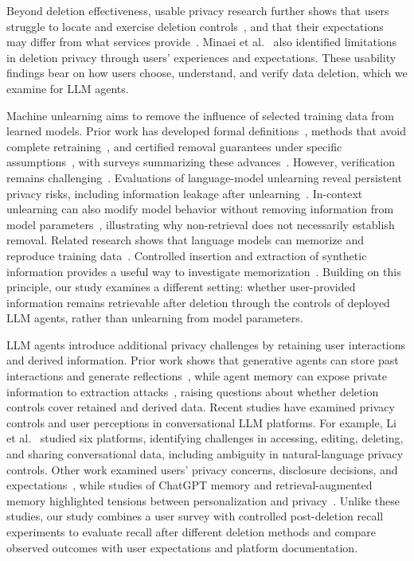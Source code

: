 Beyond deletion effectiveness, usable privacy research further shows that users struggle to locate and exercise deletion controls~\cite{ramokapane2017stupid,habib2020scavenger,bumiller2026zombies}, and that their expectations may differ from what services provide~\cite{rao2016expecting}.
%
Minaei et al.~\cite{minaei2022deletion} also identified limitations in deletion privacy through users' experiences and expectations.
%
These usability findings bear on how users choose, understand, and verify data deletion, which we examine for LLM agents.

%
Machine unlearning aims to remove the influence of selected training data from learned models.
%
Prior work has developed formal definitions~\cite{garg2020formalizing}, methods that avoid complete retraining~\cite{cao2015towards,bourtoule2021machine}, and certified removal guarantees under specific assumptions~\cite{guo2020certified}, with surveys summarizing these advances~\cite{xu2023machine}.
%
However, verification remains challenging~\cite{thudi2022necessity,xue2026towards}.
%
Evaluations of language-model unlearning reveal persistent privacy risks, including information leakage after unlearning~\cite{shi2025muse,patil2024sensitive}.
%
In-context unlearning can also modify model behavior without removing information from model parameters~\cite{pawelczyk2024incontext}, illustrating why non-retrieval does not necessarily establish removal.
%
Related research shows that language models can memorize and reproduce training data~\cite{carlini2019secret,carlini2021extracting,carlini2023quantifying,lukas2023analyzing}.
%
Controlled insertion and extraction of synthetic information provides a useful way to investigate memorization~\cite{carlini2019secret}.
%
Building on this principle, our study examines a different setting: whether user-provided information remains retrievable after deletion through the controls of deployed LLM agents, rather than unlearning from model parameters.

%
LLM agents introduce additional privacy challenges by retaining user interactions and derived information.
%
Prior work shows that generative agents can store past interactions and generate reflections~\cite{park2023generative}, while agent memory can expose private information to extraction attacks~\cite{wang2025unveiling}, raising questions about whether deletion controls cover retained and derived data.
%
Recent studies have examined privacy controls and user perceptions in conversational LLM platforms.
%
For example, Li et al.~\cite{li2026privacy} studied six platforms, identifying challenges in accessing, editing, deleting, and sharing conversational data, including ambiguity in natural-language privacy controls.
%
Other work examined users' privacy concerns, disclosure decisions, and expectations~\cite{zhang2024fair,malki2025hoovered,kwesi2026impact}, while studies of ChatGPT memory and retrieval-augmented memory highlighted tensions between personalization and privacy~\cite{chen2026relational,zhang2025understanding}.
%
Unlike these studies, our study combines a user survey with controlled post-deletion recall experiments to evaluate recall after different deletion methods and compare observed outcomes with user expectations and platform documentation.